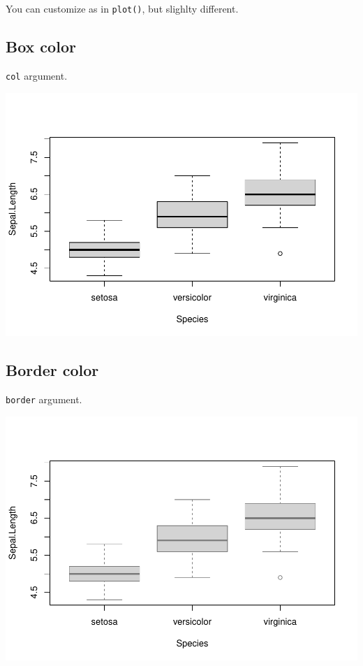 \documentclass[
]{book}
\begin{document}
You can customize as in \texttt{plot()}, but slighlty different.

\hypertarget{box-color}{%
\subsection{Box color}\label{box-color}}

\texttt{col} argument.

\includegraphics{_main_files/figure-latex/unnamed-chunk-31-1.pdf}

\hypertarget{border-color}{%
\subsection{Border color}\label{border-color}}

\texttt{border} argument.

\includegraphics{_main_files/figure-latex/unnamed-chunk-32-1.pdf}
\end{document}
